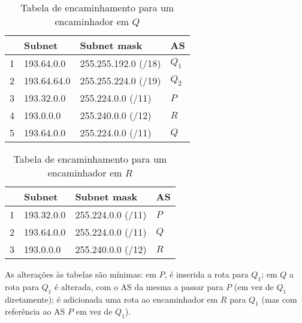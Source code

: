 \begin{enumerate}[leftmargin=\labelsep]
        \begin{table}[H]
          \centering
          \begin{tabular}{l|l|l|l}
              & Subnet      & Subnet mask         & AS    \\ \hline
            1 & 193.64.0.0  & 255.255.192.0 (/18) & $Q_1$ \\
            2 & 193.64.64.0 & 255.255.224.0 (/19) & $Q_2$ \\
            3 & 193.32.0.0  & 255.224.0.0 (/11)   & $P$   \\
            4 & 193.0.0.0   & 255.240.0.0 (/12)   & $R$   \\
            5 & 193.64.0.0  & 255.224.0.0 (/11)   & $Q$
          \end{tabular}
          \caption{Tabela de encaminhamento para um encaminhador em $Q$}
          \label{tab:q-ftable}
        \end{table}

        \begin{table}[H]
          \centering
          \begin{tabular}{l|l|l|l}
              & Subnet     & Subnet mask       & AS  \\ \hline
            1 & 193.32.0.0 & 255.224.0.0 (/11) & $P$ \\
            2 & 193.64.0.0 & 255.224.0.0 (/11) & $Q$ \\
            3 & 193.0.0.0  & 255.240.0.0 (/12) & $R$
          \end{tabular}
          \caption{Tabela de encaminhamento para um encaminhador em $R$}
          \label{tab:r-ftable}
        \end{table}


        As alterações às tabelas são mínimas: em $P$, é inserida a rota para $Q_1$;
        em $Q$ a rota para $Q_1$ é alterada, com o AS da mesma a passar para $P$ (em vez de
        $Q_1$ diretamente); é adicionada uma rota ao encaminhador em $R$ para $Q_1$
        (mas com referência ao AS $P$ em vez de $Q_1$).



\end{enumerate}
